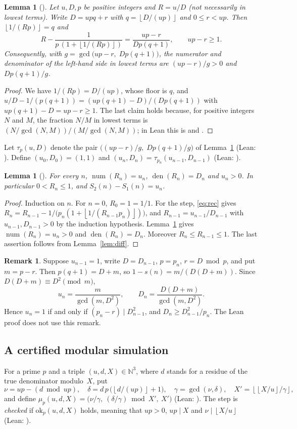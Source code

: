 \documentclass[11pt]{amsart}
\theoremstyle{plain}
\newtheorem{lemma}[theorem]{Lemma}
\theoremstyle{definition}
\newtheorem{remark}[theorem]{Remark}
\newcommand{\N}{\mathbb{N}}
\DeclareMathOperator{\num}{num}
\DeclareMathOperator{\den}{den}
\newcommand{\fl}[1]{\left\lfloor #1\right\rfloor}
\begin{document}
\begin{lemma}[]\label{lem:step}
Let $u,D,p$ be positive integers and $R=u/D$ (not necessarily in lowest terms). Write $D=upq+r$ with $q=\fl{D/(up)}$ and $0\le r<up$. Then $\fl{1/(Rp)}=q$ and
\[
  R-\frac{1}{p\,(1+\fl{1/(Rp)})}=\frac{up-r}{Dp(q+1)},\qquad up-r\ge1 .
\]
Consequently, with $g=\gcd\bigl(up-r,\;Dp(q+1)\bigr)$, the numerator and denominator of the left-hand side in lowest terms are $(up-r)/g>0$ and $Dp(q+1)/g$.
\end{lemma}
\begin{proof}
We have $1/(Rp)=D/(up)$, whose floor is $q$, and $u/D-1/(p(q+1))=(up(q+1)-D)/(Dp(q+1))$ with $up(q+1)-D=up-r\ge1$. The last claim holds because, for positive integers $N$ and $M$, the fraction $N/M$ in lowest terms is $(N/\gcd(N,M))/(M/\gcd(N,M))$; in Lean this is  and .
\end{proof}

Let $\tau_p(u,D)$ denote the pair $\bigl((up-r)/g,\;Dp(q+1)/g\bigr)$ of Lemma~\ref{lem:step} (Lean: ). Define $(u_0,D_0)=(1,1)$ and $(u_n,D_n)=\tau_{p_n}(u_{n-1},D_{n-1})$ (Lean: ).

\begin{lemma}[]\label{lem:T}
For every $n$, $\num(R_n)=u_n$, $\den(R_n)=D_n$ and $u_n>0$. In particular $0<R_n\le1$, and $S_2(n)-S_1(n)=u_n$.
\end{lemma}
\begin{proof}
Induction on $n$. For $n=0$, $R_0=1=1/1$. For the step, \eqref{eq:rec} gives $R_n=R_{n-1}-1/\bigl(p_n(1+\fl{1/(R_{n-1}p_n)})\bigr)$, and $R_{n-1}=u_{n-1}/D_{n-1}$ with $u_{n-1},D_{n-1}>0$ by the induction hypothesis. Lemma~\ref{lem:step} gives $\num(R_n)=u_n>0$ and $\den(R_n)=D_n$. Moreover $R_n\le R_{n-1}\le 1$. The last assertion follows from Lemma~\ref{lem:diff}.
\end{proof}

\begin{remark}\label{rem:unit}
Suppose $u_{n-1}=1$, write $D=D_{n-1}$, $p=p_n$, $r=D\bmod p$, and put $m=p-r$. Then $p(q+1)=D+m$, so $1-s(n)=m/(D(D+m))$. Since $D(D+m)\equiv D^2\pmod m$,
\[
  u_n=\frac{m}{\gcd(m,D^2)},\qquad D_n=\frac{D(D+m)}{\gcd(m,D^2)}.
\]
Hence $u_n=1$ if and only if $(p_n-r)\mid D_{n-1}^2$, and $D_n\ge D_{n-1}^2/p_n$. The Lean proof does not use this remark.
\end{remark}

\subsection{A certified modular simulation}
For a prime $p$ and a triple $(u,d,X)\in\N^3$, where $d$ stands for a residue of the true denominator modulo~$X$, put
\[
  \nu=up-(d\bmod up),\quad \delta=d\,p\,\bigl(\fl{d/(up)}+1\bigr),\quad \gamma=\gcd(\nu,\delta),\quad X'=\fl{\fl{X/u}/\gamma},
\]
and define $\mu_p(u,d,X)=\bigl(\nu/\gamma,\ (\delta/\gamma)\bmod X',\ X'\bigr)$ (Lean: ).
The step is \emph{checked} if $\mathrm{ok}_p(u,d,X)$ holds, meaning that $up>0$, $up\mid X$ and $\nu\mid \fl{X/u}$ (Lean: ).
\end{document}
